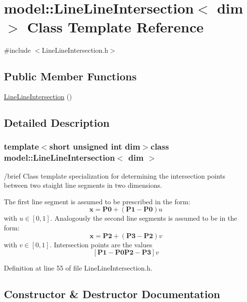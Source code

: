 \hypertarget{classmodel_1_1_line_line_intersection}{}\section{model\+:\+:Line\+Line\+Intersection$<$ dim $>$ Class Template Reference}
\label{classmodel_1_1_line_line_intersection}


{\ttfamily \#include $<$Line\+Line\+Intersection.\+h$>$}

\subsection*{Public Member Functions}
\begin{DoxyCompactItemize}
\item 
\hyperlink{classmodel_1_1_line_line_intersection_a901b262ded47e8e64802941ba89552f6}{Line\+Line\+Intersection} ()
\end{DoxyCompactItemize}


\subsection{Detailed Description}
\subsubsection*{template$<$short unsigned int dim$>$class model\+::\+Line\+Line\+Intersection$<$ dim $>$}

/brief Class template specialization for determining the intersection points between two staight line segments in two dimensions.

The first line segment is assumed to be prescribed in the form\+: \[ \mathbf{x}=\mathbf{P0}+\left(\mathbf{P1}-\mathbf{P0}\right)u \] with $u\in [0,1]$. Analogously the second line segments is assumed to be in the form\+: \[ \mathbf{x}=\mathbf{P2}+\left(\mathbf{P3}-\mathbf{P2}\right)v \] with $v\in [0,1]$. Intersection points are the values \[ \left[\mathbf{P1}-\mathbf{P0} \mathbf{P2}-\mathbf{P3}\right]v \] 

Definition at line 55 of file Line\+Line\+Intersection.\+h.



\subsection{Constructor \& Destructor Documentation}
\hypertarget{classmodel_1_1_line_line_intersection_a901b262ded47e8e64802941ba89552f6}{}
